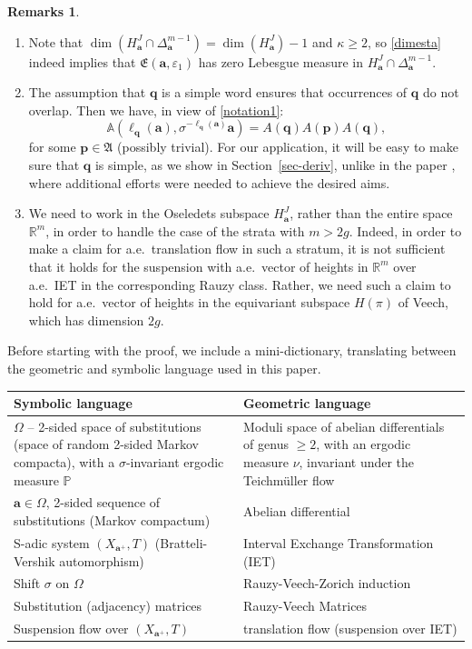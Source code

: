 \documentclass[JEP,XML,SOM,Unicode]{cedram}
\let\epsilon\varepsilon
\theoremstyle{plain}
\theoremstyle{definition}
\newtheorem*{rems*}{Remarks}
\newcommand\bom{{\boldsymbol a}}\let\ba\bom
\newcommand\bp{{\boldsymbol p}}
\newcommand\bq{{\boldsymbol q}}
\let\Om\Omega
\let\sig\sigma
\newcommand\FrA{\mathfrak{A}}
\newcommand\Fre{\mathfrak{E}}
\newcommand\Aa{\mathbb{A}}
\newcommand{\R}{\mathbb{R}}
\renewcommand{\P}{\mathbb{P}}
\newcommand\be{\begin{equation}}
\newcommand\ee{\end{equation}}
\begin{document}
\pagebreak[2]
\skpt
\begin{rems*}
\begin{enumerate}
\item
Note that $\dim( H^J_\bom \cap \Delta_\bom^{m-1}) = \dim(H^J_\bom)-1$ and $\kappa\ge 2$, so \eqref{dimesta} indeed implies that $\Fre(\bom,\epsilon_1)$ has zero Lebesgue measure in $H^J_\bom \cap \Delta_\bom^{m-1}$.

\item
The assumption that $\bq$ is a simple word ensures that occurrences of $\bq$ do not overlap. Then we have, in view of \eqref{notation1}:
\be \label{egstar}
\Aa(\ell_\bq(\bom), \sig^{-\ell_\bq(\bom)}\bom) = A(\bq) A(\bp) A(\bq),
\ee
for some $\bp \in \FrA$ (possibly trivial). For our application, it will be easy to make sure that $\bq$ is simple, as we show in Section~\ref{sec-deriv}, unlike in the paper \cite{BufGur}, where additional efforts were needed to achieve the desired aims.

\item
We need to work in the Oseledets subspace $H^J_\ba$, rather than the entire space~$\R^m$, in order to handle the case of the strata with
$m>2g$. Indeed, in order to make a claim for a.e.\ translation flow in such a stratum, it is not sufficient that it holds for the suspension with a.e.\ vector of heights in $\R^m$ over a.e.\ IET in the corresponding Rauzy class. Rather, we need such a claim to hold for a.e.\ vector of heights in the equivariant subspace $H(\pi)$ of Veech, which has dimension $2g$.
\end{enumerate}
\end{rems*}

Before starting with the proof, we include a mini-dictionary, translating between the geometric and symbolic language used in this paper.
\begin{table}[h]
\begin{center}
\smaller
\renewcommand{\arraystretch}{1.3}
\begin{tabular}{|p{}|p{}|}
\hline
\hfill Symbolic language\hfill\mbox{}&\hfill Geometric language\hfill\mbox{}\\
\hline
$\Om$ -- 2-sided space of substitutions (space of random 2-sided Markov compacta), with a $\sig$-invariant ergodic measure $\P$ & Moduli space of abelian differentials of genus $\ge 2$, with an ergodic measure $\nu$, invariant under the Teichmüller flow \\
\hline
$\ba\in \Om$, 2-sided sequence of substitutions (Markov compactum) & Abelian differential \\
\hline
S-adic system $(X_{\ba^+},T)$ (Bratteli-Vershik automorphism) &Interval Exchange Transformation (IET)\\
\hline
Shift $\sig$ on $\Om$ & Rauzy-Veech-Zorich induction \\
\hline
Substitution (adjacency) matrices & Rauzy-Veech Matrices \\
\hline
Suspension flow over $(X_{\ba^+},T)$ & translation flow (suspension over IET) \\
\hline
\end{tabular}
\end{center}
\end{table}
\end{document}
